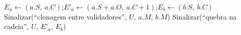 \begin{algorithm}[htbp]
\begin{algorithmic}[1]
         
          \State $E_a \gets (a.S,\ a.C)$;\quad $E'_a \gets (a.S + a.O,\ a.C + 1)$;\quad $E_b \gets (b.S,\ b.C)$
            \State Sinalizar(``clonagem entre validadores'', $U$, $a.M$, $b.M$)
          \EndIf
            \State Sinalizar(``quebra na cadeia'', $U$, $E'_a$, $E_b$)
          \EndIf
        \EndFor
      \EndFor
    \EndProcedure
  \end{algorithmic}
\end{algorithm}

